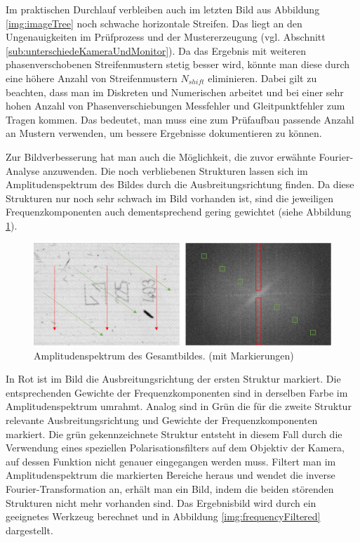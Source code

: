 Im praktischen Durchlauf verbleiben auch im letzten Bild aus Abbildung \ref{img:imageTree} noch schwache horizontale Streifen.
Das liegt an den Ungenauigkeiten im Prüfprozess und der Mustererzeugung (vgl. Abschnitt \ref{sub:unterschiedeKameraUndMonitor}).
Da das Ergebnis mit weiteren phasenverschobenen Streifenmustern stetig besser wird, könnte man diese durch eine höhere Anzahl von Streifenmustern $N_{shift}$ eliminieren.
Dabei gilt zu beachten, dass man im Diskreten und Numerischen arbeitet und bei einer sehr hohen Anzahl von Phasenverschiebungen Messfehler und Gleitpunktfehler zum Tragen kommen.
Das bedeutet, man muss eine zum Prüfaufbau passende Anzahl an Mustern verwenden, um bessere Ergebnisse dokumentieren zu können.

\p
Zur Bildverbesserung hat man auch die Möglichkeit, die zuvor erwähnte Fourier-Analyse anzuwenden.
Die noch verbliebenen Strukturen lassen sich im Amplitudenspektrum des Bildes durch die Ausbreitungsrichtung finden.
Da diese Strukturen nur noch sehr schwach im Bild vorhanden ist, sind die jeweiligen Frequenzkomponenten auch dementsprechend gering gewichtet (siehe Abbildung \ref{img:amplitudeSpectrum}).

\begin{figure}[H]
	\centering
	\includegraphics[width=\textwidth]{03_sichtpruefungDurchLichtstreuung/optimierungen/figures/amplitudeSpectrum}
	\caption[Amplitudenspektrum des Gesamtbildes]{Amplitudenspektrum des Gesamtbildes. (mit Markierungen)}
	\label{img:amplitudeSpectrum}
\end{figure}

\noindent
In Rot ist im Bild die Ausbreitungsrichtung der ersten Struktur markiert.
Die entsprechenden Gewichte der Frequenzkomponenten sind in derselben Farbe im Amplitudenspektrum umrahmt.
Analog sind in Grün die für die zweite Struktur relevante Ausbreitungsrichtung und Gewichte der Frequenzkomponenten markiert.
Die grün gekennzeichnete Struktur entsteht in diesem Fall durch die Verwendung eines speziellen Polarisationsfilters auf dem Objektiv der Kamera, auf dessen Funktion nicht genauer eingegangen werden muss.
Filtert man im Amplitudenspektrum die markierten Bereiche heraus und wendet die inverse Fourier-Transformation an, erhält man ein Bild, indem die beiden störenden Strukturen nicht mehr vorhanden sind.
Das Ergebnisbild wird durch ein geeignetes Werkzeug \cite{fourierTool} berechnet und in Abbildung \ref{img:frequencyFiltered} dargestellt.

